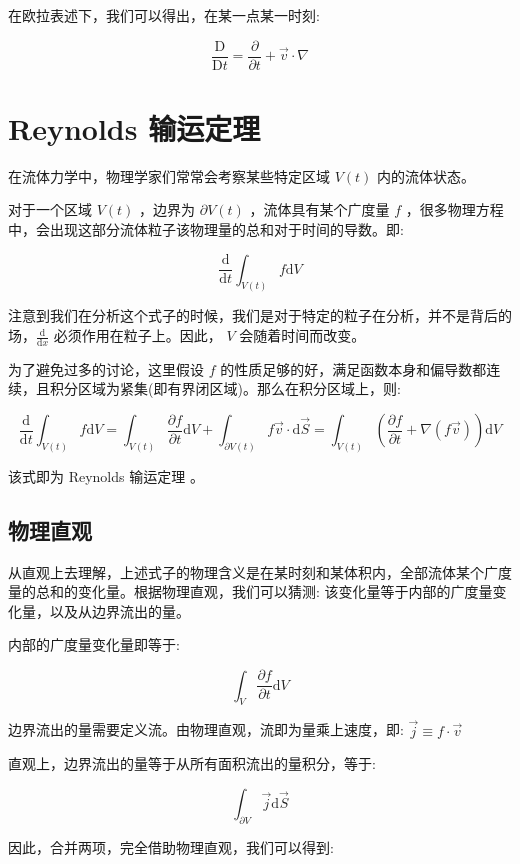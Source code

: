 \documentclass[fontset=windows]{article}
\newcommand{\upcite}[1]{\textsuperscript{\cite{#1}}}
\begin{document}
在欧拉表述下，我们可以得出，在某一点某一时刻:

$$
\frac{\mathrm{D}}{\mathrm{D}t}
= \frac{\partial}{\partial t} + \vec{v} \cdot \nabla
$$

\section{Reynolds 输运定理}

在流体力学中，物理学家们常常会考察某些特定区域 $ V(t) $ 内的流体状态。

对于一个区域 $ V(t) $ ，边界为 $ \partial V(t) $ ，流体具有某个广度量 $f$ ，很多物理方程中，会出现这部分流体粒子该物理量的总和对于时间的导数。即:

$$
\frac{\mathrm{d}}{\mathrm{d}t} \int_{V(t)} f \mathrm{d}V
$$

注意到我们在分析这个式子的时候，我们是对于特定的粒子在分析，并不是背后的场，$\frac{\mathrm{d}}{\mathrm{d}x}$ 必须作用在粒子上。因此， $V$ 会随着时间而改变。

为了避免过多的讨论，这里假设 $ f $ 的性质足够的好，满足函数本身和偏导数都连续，且积分区域为紧集(即有界闭区域)。那么在积分区域上，则:

$$
\frac{\mathrm{d}}{\mathrm{d}t} \int_{V(t)} f \mathrm{d}V
= \int_{V(t)} \frac{\partial f}{\partial t} \mathrm{d}V +
  \int_{\partial V(t)} {f \vec{v} \cdot \mathrm{d}\vec{S}}
= \int_{V(t)} (\frac{\partial f}{\partial t} + \nabla (f \vec{v})) \mathrm{d}V
$$

该式即为 Reynolds 输运定理 \upcite{ref1}。

\subsection{物理直观}

从直观上去理解，上述式子的物理含义是在某时刻和某体积内，全部流体某个广度量的总和的变化量。根据物理直观，我们可以猜测: 该变化量等于内部的广度量变化量，以及从边界流出的量。

内部的广度量变化量即等于: 

$$
\int_V \frac{\partial f}{\partial t} \mathrm{d}V
$$

边界流出的量需要定义流。由物理直观，流即为量乘上速度，即: $ \vec{j} \equiv f \cdot \vec{v} $

直观上，边界流出的量等于从所有面积流出的量积分，等于:

$$
\int_{\partial V} \vec{j} \mathrm{d} \vec{S}
$$

因此，合并两项，完全借助物理直观，我们可以得到:
\end{document}
